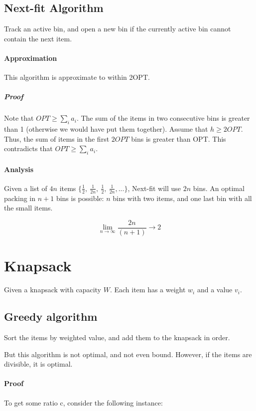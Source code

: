 \documentclass[a4paper]{article}
\begin{document}
\subsection{Next-fit Algorithm}
Track an active bin, and open a new bin if the currently active bin cannot contain the next item.

\paragraph{Approximation}
This algorithm is approximate to within 2OPT.

\subparagraph{Proof}
Note that $OPT \ge \sum_ia_i$. The sum of the items in two consecutive bins is greater than 1 (otherwise we would have put them together). Assume that $h\ge 2OPT$. Thus, the sum of items in the first $2OPT$ bins is greater than OPT. This contradicts that $OPT \ge \sum_ia_i$.

\paragraph{Analysis}
Given a list of $4n$ items $\{\frac{1}{2},\ \frac{1}{2n},\ \frac{1}{2},\ \frac{1}{2n}, ...\}$, Next-fit will use $2n$ bins. An optimal packing in $n+1$ bins is possible: $n$ bins with two items, and one last bin with all the small items.

\[\lim_{n\to\infty}\frac{2n}{(n+1)}\to2\]


\section{Knapsack}
Given a knapsack with capacity $W$. Each item has a weight $w_i$ and a value $v_i$. 


\subsection{Greedy algorithm}
Sort the items by weighted value, and add them to the knapsack in order.

But this algorithm is not optimal, and not even bound. However, if the items are divisible, it is optimal.


\paragraph{Proof}
To get some ratio c, consider the following instance:
\end{document}
